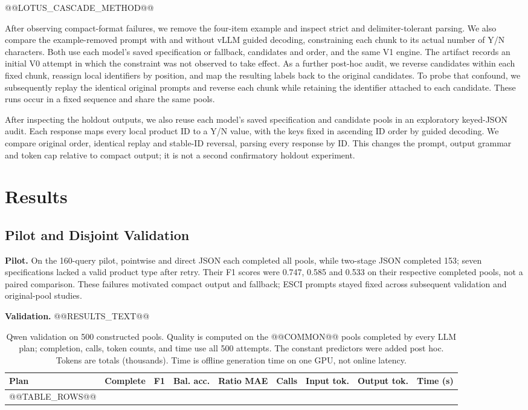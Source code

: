 \documentclass[conference]{IEEEtran}
\begin{document}
@@LOTUS_CASCADE_METHOD@@

After observing compact-format failures, we remove the four-item example and inspect strict and delimiter-tolerant parsing. We also compare the example-removed prompt with and without vLLM guided decoding, constraining each chunk to its actual number of Y/N characters. Both use each model's saved specification or fallback, candidates and order, and the same V1 engine. The artifact records an initial V0 attempt in which the constraint was not observed to take effect. As a further post-hoc audit, we reverse candidates within each fixed chunk, reassign local identifiers by position, and map the resulting labels back to the original candidates. To probe that confound, we subsequently replay the identical original prompts and reverse each chunk while retaining the identifier attached to each candidate. These runs occur in a fixed sequence and share the same pools.

After inspecting the holdout outputs, we also reuse each model's saved specification and candidate pools in an exploratory keyed-JSON audit. Each response maps every local product ID to a Y/N value, with the keys fixed in ascending ID order by guided decoding. We compare original order, identical replay and stable-ID reversal, parsing every response by ID. This changes the prompt, output grammar and token cap relative to compact output; it is not a second confirmatory holdout experiment.

\section{Results}
\subsection{Pilot and Disjoint Validation}
\textbf{Pilot.}
On the 160-query pilot, pointwise and direct JSON each completed all pools, while two-stage JSON completed 153; seven specifications lacked a valid product type after retry. Their F1 scores were 0.747, 0.585 and 0.533 on their respective completed pools, not a paired comparison. These failures motivated compact output and fallback; ESCI prompts stayed fixed across subsequent validation and original-pool studies.

\textbf{Validation.}
@@RESULTS_TEXT@@

\begin{table}[t]
\caption{Qwen validation on 500 constructed pools. Quality is computed on the @@COMMON@@ pools completed by every LLM plan; completion, calls, token counts, and time use all 500 attempts. The constant predictors were added post hoc. Tokens are totals (thousands). Time is offline generation time on one GPU, not online latency.}
\label{tab:main}
\centering\small
\begin{tabular}{lrrrrrrrr}
\toprule
Plan & Complete & F1 & Bal. acc. & Ratio MAE & Calls & Input tok. & Output tok. & Time (s) \\
\midrule
@@TABLE_ROWS@@
\bottomrule
\end{tabular}
\end{table}
\end{document}
